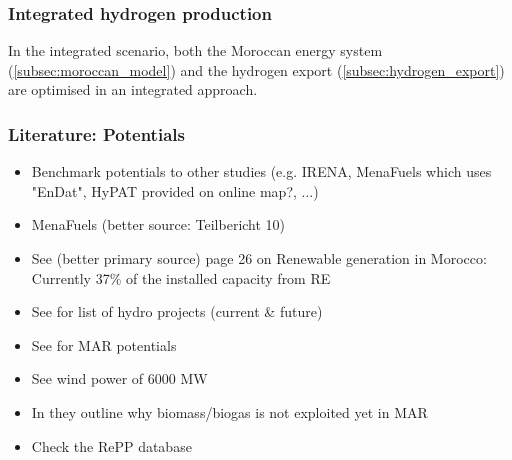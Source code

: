 \subsubsection{Integrated hydrogen production}
In the integrated scenario, both the Moroccan energy system (\ref{subsec:moroccan_model}) and the hydrogen export (\ref{subsec:hydrogen_export})
are optimised in an integrated approach.


\subsubsection{Literature: Potentials}
\begin{itemize}
    \item Benchmark potentials to other studies (e.g. IRENA, MenaFuels which uses "EnDat", HyPAT provided on online map?, ...)
    \item MenaFuels \cite[p. 25]{Ersoy2022} (better source: Teilbericht 10)
    \item See \cite{Ersoy2022} (better primary source) page 26 on Renewable generation in Morocco: Currently 37\% of the installed capacity from RE
    \item See \cite[p. 5]{Boulakhbar2020} for list of hydro projects (current \& future)
    \item See \cite[primary 10,13,17]{Boulakhbar2020} for MAR potentials
    \item See \cite[primary 13, 38]{Boulakhbar2020} wind power of 6000 MW
    \item In \cite[p. 6]{Boulakhbar2020} they outline why biomass/biogas is not exploited yet in MAR
    \item Check the RePP database \cite{Peters2023}
\end{itemize}